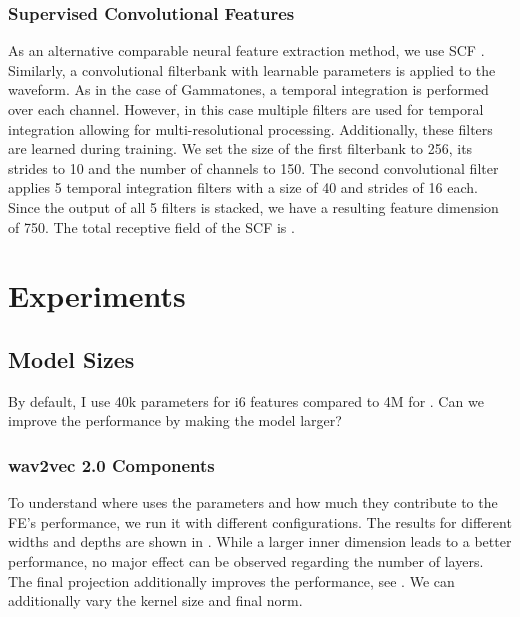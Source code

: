 \documentclass{INTERSPEECH2023}
\begin{document}
\subsubsection{Supervised Convolutional Features}
As an alternative comparable neural feature extraction method, we use \gls{SCF} \cite{tuske2018:waveform}.
Similarly, a convolutional filterbank with learnable parameters is applied to the waveform.
As in the case of Gammatones, a temporal integration is performed over each channel.
However, in this case multiple filters are used for temporal integration allowing for multi-resolutional processing.
Additionally, these filters are learned during training.
We set the size of the first filterbank to 256, its strides to 10 and the number of channels to 150.
The second convolutional filter applies 5 temporal integration filters with a size of 40 and strides of 16 each.
Since the output of all 5 filters is stacked, we have a resulting feature dimension of 750.
The total receptive field of the \gls{SCF} is .

\section{Experiments}
\subsection{Model Sizes}
By default, I use 40k parameters for i6 features compared to 4M for \wvtwo.
Can we improve the performance by making the model larger?
\subsubsection{wav2vec 2.0 Components}
To understand where \wvtwo uses the parameters and how much they contribute to the \gls{FE}'s performance, we run it with different configurations.
The results for different widths and depths are shown in .
While a larger inner dimension leads to a better performance, no major effect can be observed regarding the number of layers.
The final projection additionally improves the performance, see .
We can additionally vary the kernel size and final norm.
\end{document}
